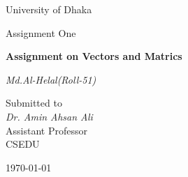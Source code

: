 \documentclass[12pt,a4paper]{report}
\begin{document}
\begin{titlepage}
\centering
{\LARGE University of Dhaka \par}
\vspace{2cm}
{\Large Assignment One\par}
\vspace{2cm}
{\huge\bfseries Assignment on Vectors and Matrics\par}
\vspace{2cm}
{\Large\itshape Md.Al-Helal(Roll-51)\par}
\vfill
Submitted to\\
\vspace{0.5cm}
{\itshape Dr. Amin Ahsan Ali} \\ Assistant Professor\\CSEDU
\vfill
{\large \today\par}
\end{titlepage}
\end{document}
